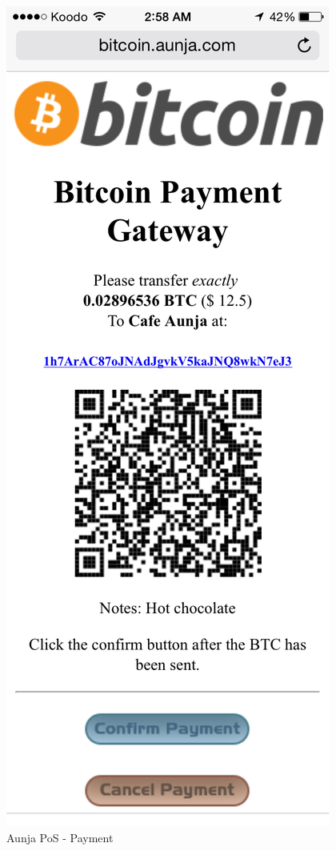 \begin{figure}[htb!p]
\centering
\includegraphics[scale=0.5]{fig/Payment.png}
  \caption{Aunja PoS - Payment}
\label{fig:payment}
\end{figure}

